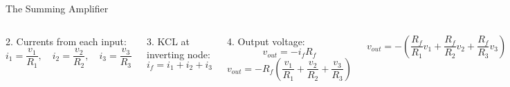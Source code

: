 \documentclass[10pt, aspectratio=169]{beamer}
\begin{document}
\begin{frame}{The Summing Amplifier}
\begin{columns}[t]
        2. Currents from each input:
        \[
        i_1 = \frac{v_1}{R_1}, \quad i_2 = \frac{v_2}{R_2}, \quad i_3 = \frac{v_3}{R_3}
        \]
        
        3. KCL at inverting node:
        \[
        i_f = i_1 + i_2 + i_3
        \]
        
        4. Output voltage:
        \[
        v_{out} = -i_f R_f
        \]
        \[
        v_{out} = -R_f \left(\frac{v_1}{R_1} + \frac{v_2}{R_2} + \frac{v_3}{R_3}\right)
        \]
        
        \[
        \boxed{v_{out} = -\left(\frac{R_f}{R_1}v_1 + \frac{R_f}{R_2}v_2 + \frac{R_f}{R_3}v_3\right)}
        \]
        
    \end{columns}
    
\end{frame}
\end{document}
